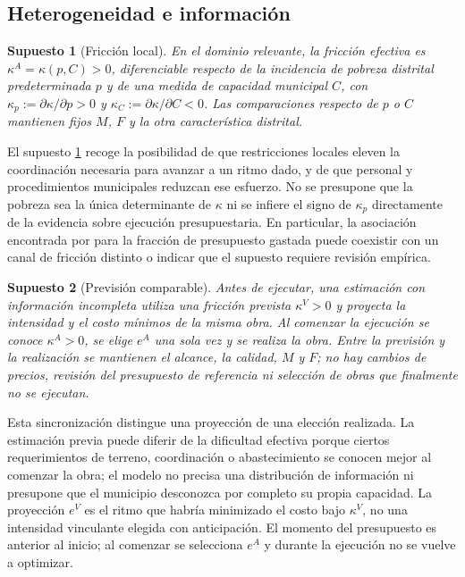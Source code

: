 \documentclass[11pt]{article}
\newtheorem{assumption}{Supuesto}
\newcommand{\kA}{\kappa^{A}}
\newcommand{\kV}{\kappa^{V}}
\begin{document}
\subsection{Heterogeneidad e información}
\begin{assumption}[Fricción local]\label{ass:hetero}
En el dominio relevante, la fricción efectiva es $\kA=\kappa(p,C)>0$, diferenciable respecto de la incidencia de pobreza distrital predeterminada $p$ y de una medida de capacidad municipal $C$, con $\kappa_p:=\partial\kappa/\partial p>0$ y $\kappa_C:=\partial\kappa/\partial C<0$. Las comparaciones respecto de $p$ o $C$ mantienen fijos $M$, $F$ y la otra característica distrital.
\end{assumption}
El supuesto \ref{ass:hetero} recoge la posibilidad de que restricciones locales eleven la coordinación necesaria para avanzar a un ritmo dado, y de que personal y procedimientos municipales reduzcan ese esfuerzo. No se presupone que la pobreza sea la única determinante de $\kappa$ ni se infiere el signo de $\kappa_p$ directamente de la evidencia sobre ejecución presupuestaria. En particular, la asociación encontrada por \citet{loayza2014} para la fracción de presupuesto gastada puede coexistir con un canal de fricción distinto o indicar que el supuesto requiere revisión empírica.

\begin{assumption}[Previsión comparable]\label{ass:prevision}
Antes de ejecutar, una estimación con información incompleta utiliza una fricción prevista $\kV>0$ y proyecta la intensidad y el costo mínimos de la misma obra. Al comenzar la ejecución se conoce $\kA>0$, se elige $e^A$ una sola vez y se realiza la obra. Entre la previsión y la realización se mantienen el alcance, la calidad, $M$ y $F$; no hay cambios de precios, revisión del presupuesto de referencia ni selección de obras que finalmente no se ejecutan.
\end{assumption}
Esta sincronización distingue una proyección de una elección realizada. La estimación previa puede diferir de la dificultad efectiva porque ciertos requerimientos de terreno, coordinación o abastecimiento se conocen mejor al comenzar la obra; el modelo no precisa una distribución de información ni presupone que el municipio desconozca por completo su propia capacidad. La proyección $e^V$ es el ritmo que habría minimizado el costo bajo $\kV$, no una intensidad vinculante elegida con anticipación. El momento del presupuesto es anterior al inicio; al comenzar se selecciona $e^A$ y durante la ejecución no se vuelve a optimizar.
\end{document}

